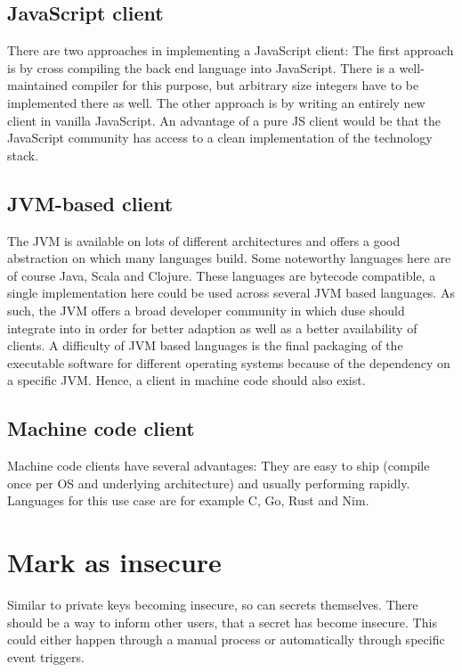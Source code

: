 \subsection{JavaScript client}

There are two approaches in implementing a JavaScript client: The first
approach is by cross compiling the back end language into JavaScript. There
is a well-maintained compiler for this purpose, but arbitrary size integers
have to be implemented there as well. The other approach is by writing
an entirely new client in vanilla JavaScript. An advantage of a pure JS
client would be that the JavaScript community has access to a clean
implementation of the technology stack.

\subsection{JVM-based client}

The JVM is available on lots of different architectures and offers a good 
abstraction on which many languages build. Some noteworthy languages here are
of course Java, Scala and Clojure. These languages are bytecode compatible,
a single implementation here could be used across several JVM based languages.
As such, the JVM offers a broad developer community in which duse should
integrate into in order for better adaption as well as a better availability of
clients. A difficulty of JVM based languages is the final packaging of the
executable software for different operating systems because of the dependency
on a specific JVM. Hence, a client in machine code should also exist.

\subsection{Machine code client}

Machine code clients have several advantages: They are easy to ship (compile
once per OS and underlying architecture) and usually performing rapidly.
Languages for this use case are for example C, Go, Rust and Nim.

\section{Mark as insecure}
\label{sec:mark_as_insecure}

Similar to private keys becoming insecure, so can secrets themselves. There
should be a way to inform other users, that a secret has become insecure. This
could either happen through a manual process or automatically through specific
event triggers.

